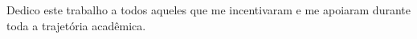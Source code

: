 \begin{dedicatoria}
Dedico este trabalho a todos aqueles que me incentivaram e me apoiaram durante toda a trajetória acadêmica.
\end{dedicatoria}
